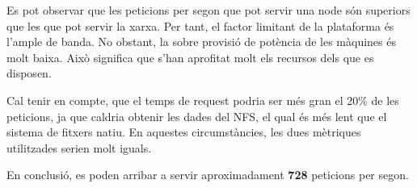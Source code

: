 Es pot observar que les peticions per segon que pot servir una node són superiors que les que pot servir la xarxa. Per tant, el factor limitant de la plataforma és l'ample de banda. No obstant, la sobre provisió de potència de les màquines és molt baixa. Això significa que s'han aprofitat molt els recursos dels que es disposen.

Cal tenir en compte, que el temps de request podria ser més gran el 20\% de les peticions, ja que caldria obtenir les dades del NFS, el qual és més lent que el sistema de fitxers natiu. En aquestes circumstàncies, les dues mètriques utilitzades serien molt iguals.

En conclusió, es poden arribar a servir aproximadament \textbf{728} peticions per segon.